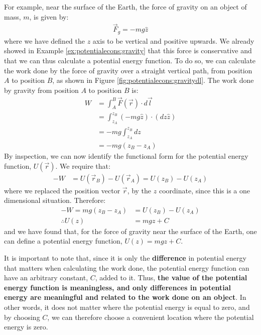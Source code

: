 For example, near the surface of the Earth, the force of gravity on an object of mass, $m$, is given by:
\begin{align*}
\vec F_g = -mg \hat z
\end{align*}
where we have defined the $z$ axis to be vertical and positive upwards. We already showed in Example \ref{ex:potentialecons:gravity} that this force is conservative and that we can thus calculate a potential energy function. To do so, we can calculate the work done by the force of gravity over a straight vertical path, from position $A$ to position $B$, as shown in Figure \ref{fig:potentialecons:gravitydl}.
The work done by gravity from position $A$ to position $B$ is:
\begin{align*}
W &= \int_A^B \vec F(\vec r) \cdot d\vec l\\
&= \int_{z_A}^{z_B} ( -mg \hat z) \cdot (dz \hat z) \\
&= -mg \int_{z_A}^{z_B} dz\\
&= -mg(z_B-z_A) 
\end{align*} 
By inspection, we can now identify the functional form for the potential energy function, $U(\vec r)$. We require that:
\begin{align*}
-W &= U(\vec r_B) - U(\vec r_A) = U(z_B) - U(z_A)
\end{align*}
where we replaced the position vector $\vec r$, by the $z$ coordinate, since this is a one dimensional situation. Therefore:
\begin{align*}
-W=mg(z_B-z_A)&= U(z_B) - U(z_A)\\
\therefore U(z) &= mgz + C
\end{align*} 
and we have found that, for the force of gravity near the surface of the Earth, one can define a potential energy function, $U(z) = mgz +C$.

It is important to note that, since it is only the \textbf{difference} in potential energy that matters when calculating the work done, the potential energy function can have an arbitrary constant, $C$, added to it. Thus, \textbf{the value of the potential energy function is meaningless, and only differences in potential energy are meaningful and related to the work done on an object}. In other words, it does not matter where the potential energy is equal to zero, and by choosing $C$, we can therefore choose a convenient location where the potential energy is zero.


